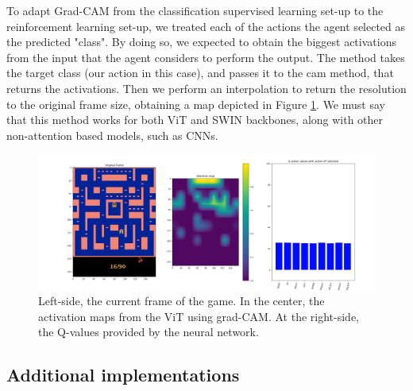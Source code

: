 To adapt Grad-CAM from the classification supervised learning set-up to the reinforcement learning set-up, we treated each of the actions the agent selected as the predicted "class". By doing so, we expected to obtain the biggest activations from the input that the agent considers to perform the output. The  method takes the target class (our action in this case), and passes it to the cam method, that returns the activations. Then we perform an interpolation to return the resolution to the original frame size, obtaining a map depicted in Figure \ref{fig:activationmapsvisualization}. We must say that this method works for both ViT and SWIN backbones, along with other non-attention based models, such as CNNs. 

\begin{figure}[!h]
	\centering
	\includegraphics[width=\linewidth]{figures/activation_maps_visualization}
	\caption{Left-side, the current frame of the game. In the center, the activation maps from the ViT using grad-CAM. At the right-side, the Q-values provided by the neural network.}
	\label{fig:activationmapsvisualization}
\end{figure}


\subsection{Additional implementations}

